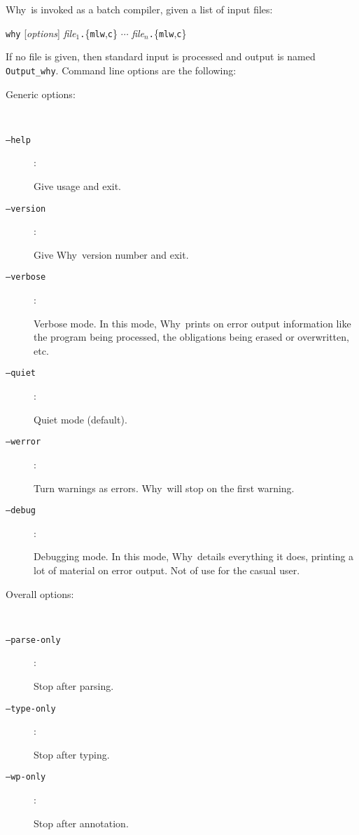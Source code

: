 \documentclass[a4paper,12pt]{report}
\newcommand{\why}{\textsf{Why}}
\begin{document}
\why\ is invoked as a batch compiler, given a list of input files:
\begin{center}
  \texttt{why} [\textit{options}] 
  \textit{file}$_1$\texttt{.}\{\texttt{mlw},\texttt{c}\} $\cdots$
  \textit{file}$_n$\texttt{.}\{\texttt{mlw},\texttt{c}\}
\end{center}
If no file is given, then standard input is processed and output is
named \texttt{Output\_why}.
Command line options are the following:
\begin{description}
  \item[Generic options:] ~\par
  \item[\texttt{--help}]: ~\par    
    Give usage and exit. 
  \item[\texttt{--version}]: ~\par    
    Give \why\ version number and exit. 
  \item[\texttt{--verbose}]: ~\par 
    Verbose mode. In this mode, \why\ prints on error output
    information like the program being processed, the obligations
    being erased or overwritten, etc.
  \item[\texttt{--quiet}]: ~\par  
    Quiet mode (default).
  \item[\texttt{--werror}]: ~\par 
    Turn warnings as errors. \why\ will stop on the first warning.
  \item[\texttt{--debug}]: ~\par 
    Debugging mode. In this mode, \why\ details everything it does,
    printing a lot of material on error output. Not of use for the
    casual user.

  \item[Overall options:] ~\par
  \item[\texttt{--parse-only}]: ~\par  
    Stop after parsing.
  \item[\texttt{--type-only}]:  ~\par  
    Stop after typing.
  \item[\texttt{--wp-only}]:    ~\par  
    Stop after annotation.


\end{description}
\end{document}
